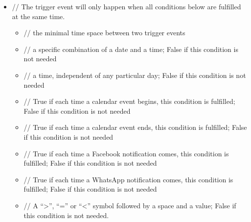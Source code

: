 \documentclass[a4paper]{scrreprt}
\begin{document}
{\begin{itemize}
                    \item {}
                        \par // The trigger event will only happen when all conditions below are fulfilled at the same time.
                        \begin{itemize}
                            \item {}
                                \par // the minimal time space between two trigger events
                            \item {}
                                \par // a specific combination of a date and a time; False if this condition is not needed
                            \item {}
                                \par // a time, independent of any particular day; False if this condition is not needed
                            \item {}
                                \par // True if each time a calendar event begins, this condition is fulfilled; False if this condition is not needed
                            \item {}
                                \par // True if each time a calendar event ends, this condition is fulfilled; False if this condition is not needed
                            \item {}
                                \par // True if each time a Facebook notification comes, this condition is fulfilled; False if this condition is not needed
                            \item {}
                                \par // True if each time a WhatsApp notification comes, this condition is fulfilled; False if this condition is not needed
                            \item {}
                                \par // A “>”, “=” or “<” symbol followed by a space and a value; False if this condition is not needed.

\end{itemize}
\end{itemize}}
\end{document}
